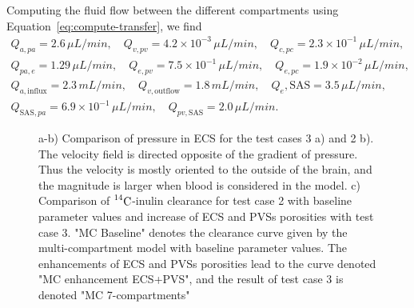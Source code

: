 \documentclass[a4paper,11pt]{article}
\newcommand{\1}{^{(1)}}
\newcommand{\2}{^{(2)}}
\newcommand{\Cinulin}{$\prescript{14}{}{\text{C}}$-inulin }
\begin{document}
Computing the fluid flow between the different compartments using Equation~\eqref{eq:compute-transfer}, we find 
\[
\begin{aligned}
    Q_{a,pa} = 2.6 \, \si{\mu L/min},\quad Q_{v,pv} = 4.2 \times 10^{-3} \, \si{\mu L/min},\quad Q_{c,pc} = 2.3\times 10^{-1}  \, \si{\mu L/min}, \\
    Q_{pa,e} = 1.29 \, \si{\mu L/min},\quad Q_{e,pv} = 7.5 \times 10^{-1}  \,\si{\mu L/min},\quad Q_{e,pc} = 1.9 \times 10^{-2} \, \si{\mu L/min}, \\
    Q_{a,\text{influx}} = 2.3 \, \si{mL/min} , \quad Q_{v,\text{outflow}  } = 1.8 \, \si{mL/min},\quad Q_{e},\text{SAS} = 3.5 \, \si{\mu L/min},\\
    Q_{\text{SAS},pa} = 6.9 \times 10^{-1}\,  \si{\mu L/min},\quad Q_{pv,\text{SAS}} = 2.0 \, \si{\mu L/min}.
\end{aligned}
\]



\begin{figure}[htb]
    \centering
    \caption{a-b) Comparison of pressure in ECS for the test cases 3 a) and 2 b). The velocity field is directed opposite of the gradient of pressure. Thus the velocity is mostly oriented to the outside of the brain, and the magnitude is larger when blood is considered in the model. c) Comparison of \Cinulin clearance for test case 2 with baseline parameter values and increase of ECS and PVSs porosities with test case 3. "MC Baseline" denotes the clearance curve given by the multi-compartment model with baseline parameter values. The enhancements of ECS and PVSs porosities lead to the curve denoted "MC enhancement ECS+PVS", and the result of test case 3 is denoted "MC 7-compartments"}
    \label{fig:blood}
\end{figure}
\end{document}
